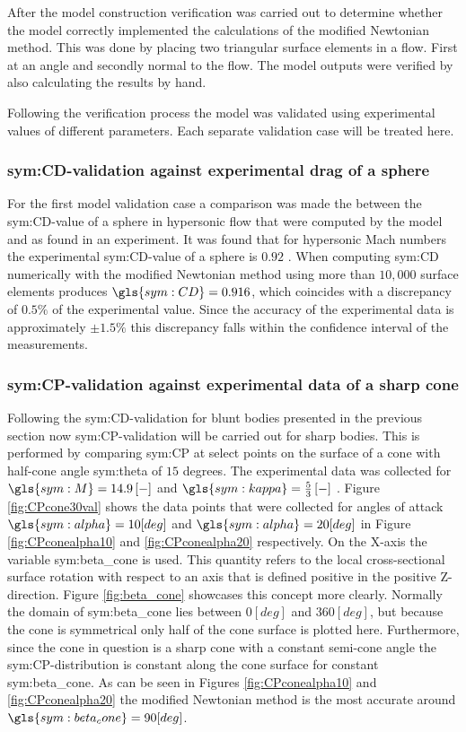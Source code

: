 After the model construction verification was carried out to determine whether the model correctly implemented the calculations of the modified Newtonian method. This was done by placing two triangular surface elements in a flow. First at an angle and secondly normal to the flow. The model outputs were verified by also calculating the results by hand.

Following the verification process the model was validated using experimental values of different parameters. Each separate validation case will be treated here.

\subsubsection{\gls{sym:CD}-validation against experimental drag of a sphere}
\label{subsubsec:valsphere}
For the first model validation case a comparison was made the between the \gls{sym:CD}-value of a sphere in hypersonic flow that were computed by the model and as found in an experiment. It was found that for hypersonic Mach numbers the experimental \gls{sym:CD}-value of a sphere is $0.92$ \cite{Bailey1966,AndersonJr.2007,Cox1965}. When computing \gls{sym:CD} numerically with the modified Newtonian method using more than $10,000$ surface elements produces $\gls{sym:CD}=0.916$, which coincides with a discrepancy of $0.5\%$ of the experimental value. Since the accuracy of the experimental data is approximately $\pm1.5\%$ \cite{Bailey1966} this discrepancy falls within the confidence interval of the measurements.

\subsubsection{\gls{sym:CP}-validation against experimental data of a sharp cone}
\label{subsubsec:valsharpconeCP}
Following the \gls{sym:CD}-validation for blunt bodies presented in the previous section now \gls{sym:CP}-validation will be carried out for sharp bodies. This is performed by comparing \gls{sym:CP} at select points on the surface of a cone with half-cone angle \gls{sym:theta} of $15$ degrees. The experimental data was collected for $\gls{sym:M}=14.9\left[-\right]$ and $\gls{sym:kappa}=\frac{5}{3}\left[-\right]$  \cite{Bertin1994,Cleary1970}. Figure \ref{fig:CPcone30val} shows the data points that were collected for angles of attack $\gls{sym:alpha}=10 [deg]$ and $\gls{sym:alpha}=20 [deg]$ in Figure \ref{fig:CPconealpha10} and \ref{fig:CPconealpha20} respectively. On the X-axis the variable \gls{sym:beta_cone} is used. This quantity refers to the local cross-sectional surface rotation with respect to an axis that is defined positive in the positive Z-direction. Figure \ref{fig:beta_cone} showcases this concept more clearly. Normally the domain of \gls{sym:beta_cone} lies between $0 [deg]$ and $360 [deg]$, but because the cone is symmetrical only half of the cone surface is plotted here. Furthermore, since the cone in question is a sharp cone with a constant semi-cone angle the \gls{sym:CP}-distribution is constant along the cone surface for constant \gls{sym:beta_cone}.
As can be seen in Figures \ref{fig:CPconealpha10} and \ref{fig:CPconealpha20} the modified Newtonian method is the most accurate around $\gls{sym:beta_cone}=90 [deg]$.

